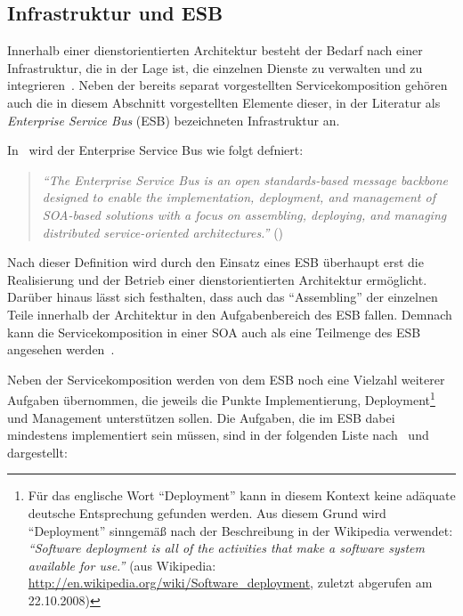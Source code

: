 
\subsection{Infrastruktur und ESB} %
\label{sub:infrastruktur}

  Innerhalb einer dienstorientierten Architektur besteht der Bedarf nach einer Infrastruktur, die in der Lage ist, die einzelnen Dienste zu verwalten und zu integrieren~\citep[S. 270]{web_services_principles_and_technology}. Neben der bereits separat vorgestellten Servicekomposition gehören auch die in diesem Abschnitt vorgestellten Elemente dieser, in der Literatur als \emph{Enterprise Service Bus} (ESB) bezeichneten Infrastruktur an.
  
  In~\citep{web_services_principles_and_technology} wird der Enterprise Service Bus wie folgt defniert:
  
  \begin{quote}
    \label{def:enterprise_serivce_bus}
    \emph{"`The Enterprise Service Bus is an open standards-based message backbone designed to enable the implementation, deployment, and management of SOA-based solutions with a focus on assembling, deploying, and managing distributed service-oriented architectures."'} (\citep[S. 270]{web_services_principles_and_technology})
  \end{quote}
  
  Nach dieser Definition wird durch den Einsatz eines ESB überhaupt erst die Realisierung und der Betrieb einer dienstorientierten Architektur ermöglicht. Darüber hinaus lässt sich festhalten, dass auch das "`Assembling"' der einzelnen Teile innerhalb der Architektur in den Aufgabenbereich des ESB fallen. Demnach kann die Servicekomposition in einer SOA auch als eine Teilmenge des ESB angesehen werden~\citep[S. 3]{enterprise_service_bus}.

  Neben der Servicekomposition werden von dem ESB noch eine Vielzahl weiterer Aufgaben übernommen, die jeweils die Punkte Implementierung, Deployment\footnote{Für das englische Wort "`Deployment"' kann in diesem Kontext keine adäquate deutsche Entsprechung gefunden werden. Aus diesem Grund wird "`Deployment"' sinngemäß nach der Beschreibung in der Wikipedia verwendet: \emph{"`Software deployment is all of the activities that make a software system available for use."'} (aus Wikipedia: \url{http://en.wikipedia.org/wiki/Software_deployment}, zuletzt abgerufen am 22.10.2008)} und Management unterstützen sollen. Die Aufgaben, die im ESB dabei mindestens implementiert sein müssen, sind in der folgenden Liste nach~\citep[S. 137]{soa_goes_real} und~\citep[S. 146]{masak2007ssb} dargestellt:
  
